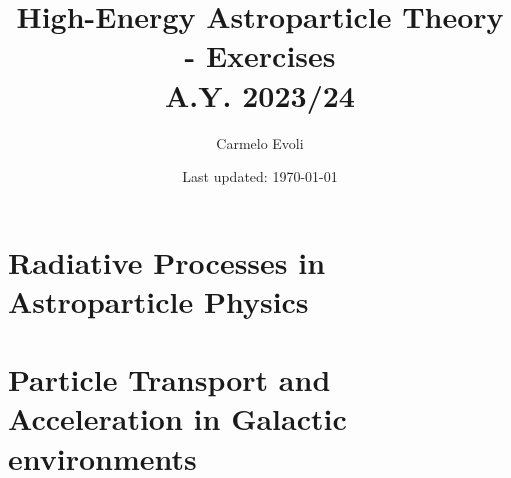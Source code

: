 \documentclass[letterpaper, 11pt, notitlepage]{report}
\begin{document}
\title{High-Energy Astroparticle Theory - {\color{blue}Exercises} \\[1em]
\normalsize A.Y. 2023/24}

\author{\normalsize Carmelo Evoli}
\date{\normalsize\vspace{-1ex} Last updated: \today}

\maketitle

\tableofcontents\label{sec:contents}

\newpage

\chapter{Radiative Processes in Astroparticle Physics} 











\chapter{Particle Transport and Acceleration in Galactic environments}







\end{document}
